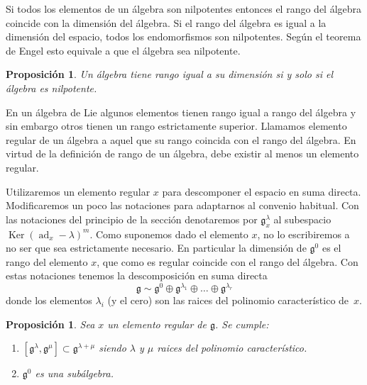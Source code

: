 \documentclass[a4paper,draft,12pt]{scrartcl}
\newtheorem{propo}[teo]{Proposición}%
\newcommand{\g}{\mathfrak{g}}%
\newcommand{\df}[1]{\textsf{\color{blue}#1}}
\DeclareMathOperator{\Ker}{Ker}%
\DeclareMathOperator{\ad}{ad}  %
\begin{document}
 Si todos los elementos de un álgebra son nilpotentes entonces el rango del álgebra coincide con la dimensión del álgebra.  Si el rango del álgebra es igual a la dimensión del espacio, todos los endomorfismos son nilpotentes.  Según el teorema de Engel esto equivale a que el álgebra sea nilpotente.
 
 \begin{propo}
 
 Un álgebra tiene rango igual a su dimensión si y solo si el álgebra es nilpotente.
 
 \end{propo}
 
 En un álgebra de Lie algunos elementos tienen rango igual a rango del álgebra y sin embargo otros tienen un rango estrictamente superior.  Llamamos  \df{elemento regular} de un álgebra a aquel que su rango coincida con el rango del álgebra.   En virtud de la definición de rango de un álgebra, debe existir al menos un elemento regular.
 
 Utilizaremos un elemento regular $x$ para descomponer el espacio en suma directa.  Modificaremos un poco las notaciones para adaptarnos al convenio habitual.  Con las notaciones del principio de la sección denotaremos por $\g_x^\lambda$ al subespacio $\Ker(\ad_x-\lambda)^m$. Como suponemos dado el elemento $x$,  no lo escribiremos a no ser que sea estrictamente necesario.  En particular la dimensión de  $\g^0$ es el rango del elemento $x$, que como es regular coincide con el rango del álgebra.  Con estas notaciones tenemos la descomposición en suma directa
 $$
 \g \sim \g^0 \oplus \g^{\lambda_1} \oplus \dots \oplus \g^{\lambda_r}
 $$
 donde los elementos $\lambda_i$ (y el cero) son las raices del polinomio característico de~$x$.
 
 \begin{propo}
 
 Sea $x$ un elemento regular de $\g$.  Se cumple:
 
 \begin{enumerate}[\indent 1.- ]
 
 \item $[\g^\lambda, \g^\mu] \subset \g^{\lambda+\mu}$ siendo $\lambda $ y $\mu$ raices del polinomio característico.
 
 \item  $\g^0$ es una subálgebra.
 
 \end{enumerate}
 
 \end{propo}
 
\end{document}
